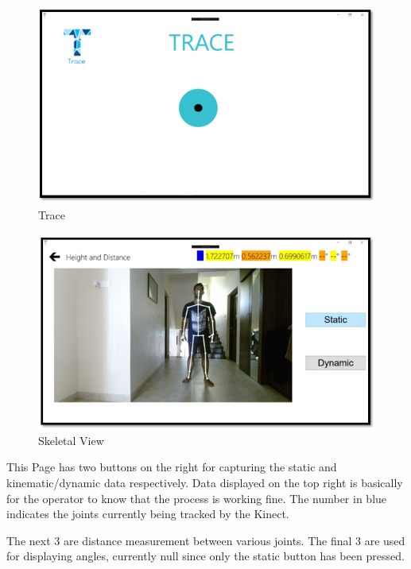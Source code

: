 \begin{figure}[h]
\centering
\includegraphics[scale=0.8]{trace.png}
\caption{Trace}
\end{figure} 

\begin{figure}[h]
\centering
\includegraphics[scale=0.8]{john.png}
\caption{Skeletal View}
\end{figure}
\newpage
\noindent This Page has two buttons on the right for capturing the static and kinematic/dynamic data respectively. Data displayed on the top right is basically for the operator to know that the process is working fine. The number in blue indicates the joints currently being tracked by the Kinect. 

\noindent The next 3 are distance measurement between various joints. The final 3 are used for displaying angles, currently null since only the static button has been pressed.

